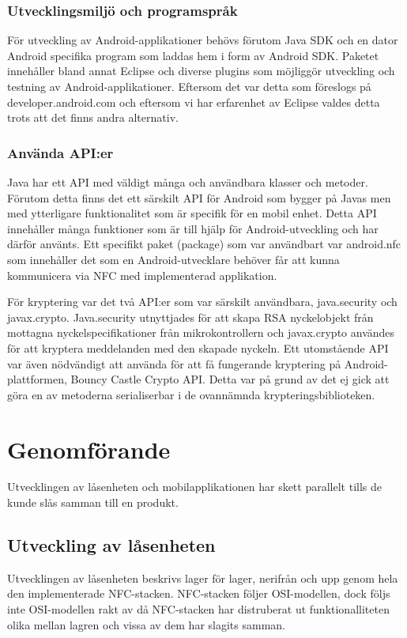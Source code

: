 \documentclass[11pt]{article}
\begin{document}
\subsubsection{Utvecklingsmiljö och programspråk}
För utveckling av Android-applikationer behövs förutom Java SDK och en dator Android specifika program som laddas hem i form av Android SDK. Paketet innehåller bland annat Eclipse och diverse plugins som möjliggör utveckling och testning av Android-applikationer. Eftersom det var detta som föreslogs på developer.android.com och eftersom vi har erfarenhet av Eclipse valdes detta trots att det finns andra alternativ.

\subsubsection{Använda API:er}
Java har ett API med väldigt många och användbara klasser och metoder. Förutom detta finns det ett särskilt API för Android som bygger på Javas men med ytterligare funktionalitet som är specifik för en mobil enhet. Detta API innehåller många funktioner som är till hjälp för Android-utveckling och har därför använts. Ett specifikt paket (package) som var användbart var android.nfc som innehåller det som en Android-utvecklare behöver får att kunna kommunicera via NFC med implementerad applikation.

För kryptering var det två API:er som var särskilt användbara, java.security och javax.crypto. Java.security utnyttjades för att skapa RSA nyckelobjekt från mottagna nyckelspecifikationer från mikrokontrollern och javax.crypto användes för att kryptera meddelanden med den skapade nyckeln.  Ett utomstående API var även nödvändigt att använda för att få fungerande kryptering på Android-plattformen, Bouncy Castle Crypto API. Detta var på grund av det ej gick att göra en av metoderna serialiserbar i de ovannämnda krypteringsbiblioteken.

\section{Genomförande}
Utvecklingen av låsenheten och mobilapplikationen har skett parallelt tills de kunde slås samman till en produkt.

\subsection{Utveckling av låsenheten}
Utvecklingen av låsenheten beskrivs lager för lager, nerifrån och upp genom hela den implementerade NFC-stacken. NFC-stacken följer OSI-modellen, dock följs inte OSI-modellen rakt av då NFC-stacken har distruberat ut funktionalliteten olika mellan lagren och vissa av dem har slagits samman. 
\end{document}
